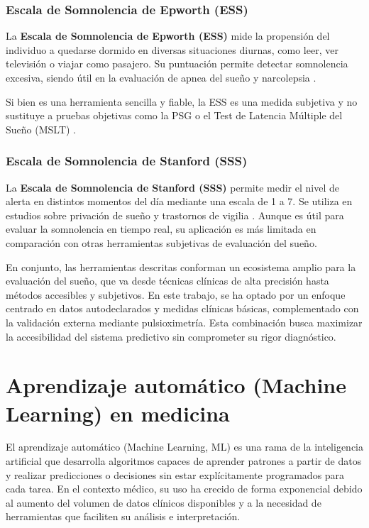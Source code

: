 \subsubsection{Escala de Somnolencia de Epworth (ESS)}
La \textbf{Escala de Somnolencia de Epworth (ESS)} mide la propensión del individuo a quedarse dormido en diversas situaciones diurnas, como leer, ver televisión o viajar como pasajero. Su puntuación permite detectar somnolencia excesiva, siendo útil en la evaluación de apnea del sueño y narcolepsia \cite{epworth}.

Si bien es una herramienta sencilla y fiable, la ESS es una medida subjetiva y no sustituye a pruebas objetivas como la PSG o el Test de Latencia Múltiple del Sueño (MSLT) \cite{pedrozo2020estructura}.

\subsubsection{Escala de Somnolencia de Stanford (SSS)}
La \textbf{Escala de Somnolencia de Stanford (SSS)} permite medir el nivel de alerta en distintos momentos del día mediante una escala de 1 a 7. Se utiliza en estudios sobre privación de sueño y trastornos de vigilia \cite{stanford}. Aunque es útil para evaluar la somnolencia en tiempo real, su aplicación es más limitada en comparación con otras herramientas subjetivas de evaluación del sueño.

\noindent
En conjunto, las herramientas descritas conforman un ecosistema amplio para la evaluación del sueño, que va desde técnicas clínicas de alta precisión hasta métodos accesibles y subjetivos. En este trabajo, se ha optado por un enfoque centrado en datos autodeclarados y medidas clínicas básicas, complementado con la validación externa mediante pulsioximetría. Esta combinación busca maximizar la accesibilidad del sistema predictivo sin comprometer su rigor diagnóstico.


\section{Aprendizaje automático (Machine Learning) en medicina}

El aprendizaje automático (Machine Learning, ML) es una rama de la inteligencia artificial que desarrolla algoritmos capaces de aprender patrones a partir de datos y realizar predicciones o decisiones sin estar explícitamente programados para cada tarea. En el contexto médico, su uso ha crecido de forma exponencial debido al aumento del volumen de datos clínicos disponibles y a la necesidad de herramientas que faciliten su análisis e interpretación.

